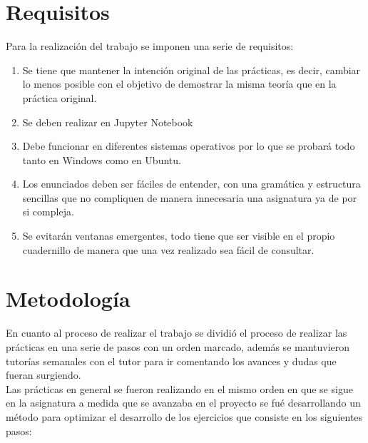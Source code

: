 \section{Requisitos}

Para la realización del trabajo se imponen una serie de requisitos:
\begin{enumerate}
    \item Se tiene que mantener la intención original de las prácticas, es decir, cambiar lo menos posible con el objetivo de demostrar la misma teoría que en la práctica original.
    \item Se deben realizar en Jupyter Notebook
    \item Debe funcionar en diferentes sistemas operativos por lo que se probará todo tanto en Windows como en Ubuntu.
    \item Los enunciados deben ser fáciles de entender, con una gramática y estructura sencillas que no compliquen de manera innecesaria una asignatura ya de por si compleja.
    \item Se evitarán ventanas emergentes, todo tiene que ser visible en el propio cuadernillo de manera que una vez realizado sea fácil de consultar.
\end{enumerate}

\section{Metodología}

En cuanto al proceso de realizar el trabajo se dividió el proceso de realizar las prácticas en una serie de pasos con un orden marcado, además se mantuvieron tutorías semanales con el tutor para ir comentando los avances y dudas que fueran surgiendo. \\

Las prácticas en general se fueron realizando en el mismo orden en que se sigue en la asignatura a medida que se avanzaba en el proyecto se fué desarrollando un método para optimizar el desarrollo de los ejercicios que consiste en los siguientes pasos:

